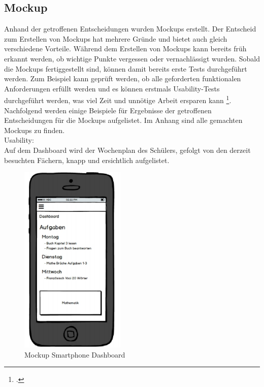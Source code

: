 \subsection{Mockup}
Anhand der getroffenen Entscheidungen wurden Mockups erstellt. Der Entscheid zum Erstellen von Mockups hat mehrere Gründe und bietet auch gleich verschiedene Vorteile. Während dem Erstellen von Mockups kann bereits früh erkannt werden, ob wichtige Punkte vergessen oder vernachlässigt wurden. Sobald die Mockups fertiggestellt sind, können damit bereits erste Tests durchgeführt werden. Zum Beispiel kann geprüft werden, ob alle geforderten funktionalen Anforderungen erfüllt werden und es können erstmals Usability-Tests durchgeführt werden, was viel Zeit und unnötige Arbeit ersparen kann \footcite{mockups}. \\

Nachfolgend werden einige Beispiele für Ergebnisse der getroffenen Entscheidungen für die Mockups aufgelistet. Im Anhang sind alle gemachten Mockups zu finden. \\ %

Usability: \\
Auf dem Dashboard wird der Wochenplan des Schülers, gefolgt von den derzeit besuchten Fächern, knapp und ersichtlich aufgelistet. \\
\begin{minipage}{\textwidth}
	\begin{figure}[H]
	\centering
		\includegraphics[width=5cm, keepaspectratio]{images/Mockups/Dashboard_Smartphone.png}
		\caption{Mockup Smartphone Dashboard}
	\end{figure}
\end{minipage}


